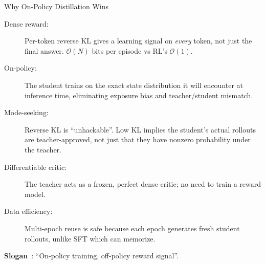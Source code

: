 \begin{frame}{Why On-Policy Distillation Wins}
  \begin{description}
    \item[Dense reward:] Per-token reverse KL gives a learning signal on \emph{every} token, not just the final answer. $\mathcal{O}(N)$ bits per episode vs RL's $\mathcal{O}(1)$.
    \item[On-policy:] The student trains on the exact state distribution it will encounter at inference time, eliminating exposure bias and teacher/student mismatch.
    \item[Mode-seeking:] Reverse KL is ``unhackable''. Low KL implies the student's actual rollouts are teacher-approved, not just that they have nonzero probability under the teacher.
    \item[Differentiable critic:] The teacher acts as a frozen, perfect dense critic; no need to train a reward model.
    \item[Data efficiency:] Multi-epoch reuse is safe because each epoch generates fresh student rollouts, unlike SFT which can memorize.
  \end{description}

  \vspace{0.3em}
  \begin{tcolorbox}[colback=green!5, colframe=green!50!black, boxrule=0.5pt, arc=2pt, left=4pt, right=4pt, top=3pt, bottom=3pt]
  \textbf{Slogan}~\cite{thinkingmachines2025distillation}: ``On-policy training, off-policy reward signal''.
  \end{tcolorbox}
\end{frame}


